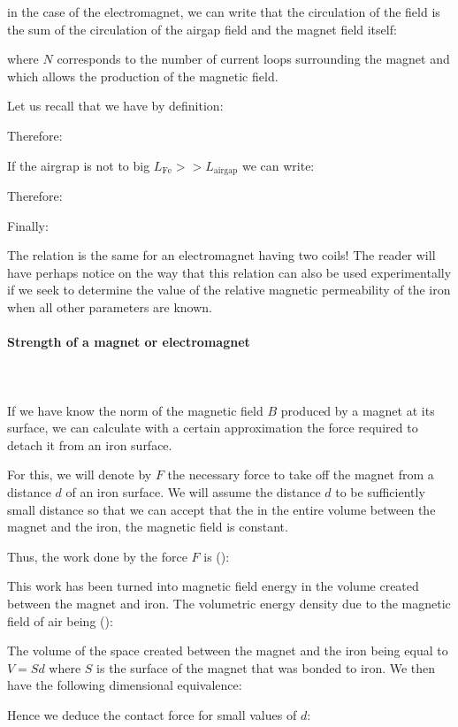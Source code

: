	in the case of the electromagnet, we can write that the circulation of the field is the sum of the circulation of the airgap field and the magnet field itself:
	
	where $N$ corresponds to the number of current loops surrounding the magnet and which allows the production of the magnetic field.
	
	Let us recall that we have by definition:
	
	Therefore:
	
	If the airgrap is not to big $L_\text{Fe}>>L_\text{airgap}$ we can write:
	
	Therefore:
	
	Finally:
	
	The relation is the same for an electromagnet having two coils! The reader will have perhaps notice on the way that this relation can also be used experimentally if we seek to determine the value of the relative magnetic permeability of the iron when all other parameters are known.
	
	\paragraph{Strength of a magnet or electromagnet}\mbox{}\\\\
	If we have know the norm of the magnetic field $B$ produced by a magnet at its surface, we can calculate with a certain approximation the force required to detach it from an iron surface.
	
	For this, we will denote by $F$ the necessary force to take off the magnet from a distance $d$ of an iron surface. We will assume the distance $d$ to be sufficiently small distance so that we can accept that the in the entire volume between the magnet and the iron, the magnetic field is constant.
	
	Thus, the work done by the force $F$ is ():
	
	This work has been turned into magnetic field energy in the volume created between the magnet and iron. The volumetric energy density due to the magnetic field of air being ():
	
	The volume of the space created between the magnet and the iron being equal to $V=Sd$ where $S$ is the surface of the magnet that was bonded to iron. We then have the following dimensional equivalence:
	
	Hence we deduce the contact force for small values of $d$:
	
